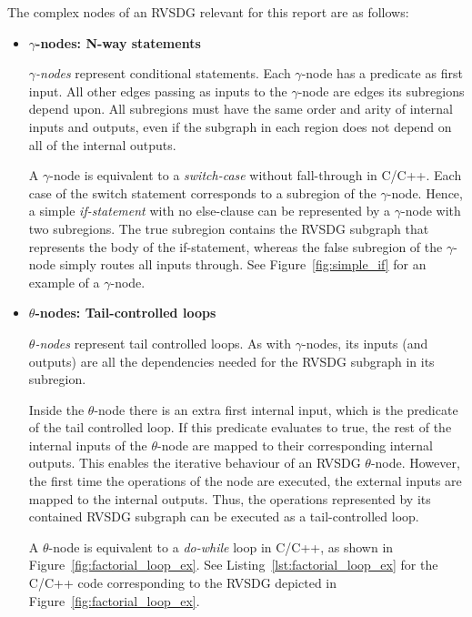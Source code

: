 The complex nodes of an RVSDG relevant for this report are as follows:

\begin{itemize}

\item \textbf{$\gamma$-nodes: N-way statements}

\textit{$\gamma$-nodes} represent conditional statements. Each $\gamma$-node has
a predicate as first input. All other edges passing as inputs to the
$\gamma$-node are edges its subregions depend upon. All subregions must have the
same order and arity of internal inputs and outputs, even if the subgraph in
each region does not depend on all of the internal outputs.

A $\gamma$-node is equivalent to a \textit{switch-case} without fall-through in
C/C++. Each case of the switch statement corresponds to a subregion of the
$\gamma$-node. Hence, a simple \textit{if-statement} with no else-clause can be
represented by a $\gamma$-node with two subregions. The true subregion contains
the RVSDG subgraph that represents the body of the if-statement, whereas the
false subregion of the $\gamma$-node simply routes all inputs through. See
Figure~\ref{fig:simple_if} for an example of a $\gamma$-node.

\item \textbf{$\theta$-nodes: Tail-controlled loops}

\textit{$\theta$-nodes} represent tail controlled loops. As with
$\gamma$-nodes, its inputs (and outputs) are all the dependencies needed for the
RVSDG subgraph in its subregion.

Inside the $\theta$-node there is an extra first internal input, which is the
predicate of the tail controlled loop. If this predicate evaluates to true, the
rest of the internal inputs of the $\theta$-node are mapped to their
corresponding internal outputs. This enables the iterative behaviour of an RVSDG
$\theta$-node. However, the first time the operations of the node are executed,
the external inputs are mapped to the internal outputs. Thus, the operations
represented by its contained RVSDG subgraph can be executed as a tail-controlled
loop.

A $\theta$-node is equivalent to a \textit{do-while} loop in C/C++, as shown in
Figure~\ref{fig:factorial_loop_ex}. See Listing~\ref{lst:factorial_loop_ex} for
the C/C++ code corresponding to the RVSDG depicted in
Figure~\ref{fig:factorial_loop_ex}.


\end{itemize}
